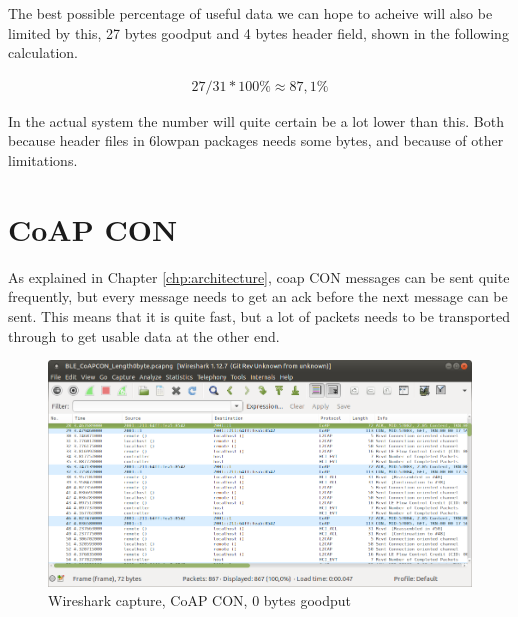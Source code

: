 The best possible percentage of useful data we can hope to acheive will also be limited by this, 27 bytes goodput and 4 bytes header field, shown in the following calculation.  

\begin{align}
    27/31*100\% \approx 87,1 \%
\end{align}





In the actual system the number will quite certain be a lot lower than this. Both because header files in \gls{6lowpan} packages needs some bytes, and because of other limitations. 


\section{CoAP CON}

As explained in Chapter \ref{chp:architecture}, \gls{coap} CON messages can be sent quite frequently, but every message needs to get an \gls{ack} before the next message can be sent. This means that it is quite fast, but a lot of packets needs to be transported through to get usable data at the other end. 


\begin{figure}[ht]
    \centering
    \includegraphics[width=\textwidth]{wiresharkCoAPCON0byte.png}    
    \caption{Wireshark capture, CoAP CON, 0 bytes goodput}
    \label{fig:coapCON0Wireshark}
\end{figure}



